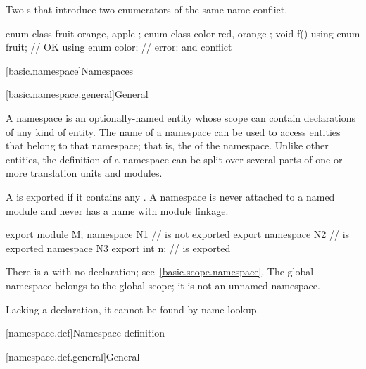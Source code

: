 \pnum
\begin{note}
Two s
that introduce two enumerators of the same name conflict.
\begin{example}
\begin{codeblock}
enum class fruit { orange, apple };
enum class color { red, orange };
void f() {
  using enum fruit;             // OK
  using enum color;             // error:  and  conflict
}
\end{codeblock}
\end{example}
\end{note}

[basic.namespace]{Namespaces}%

[basic.namespace.general]{General}%

\pnum
A namespace is an optionally-named entity
whose scope can contain declarations of any kind of entity.
The name of a
namespace can be used to access entities that belong to that namespace;
that is, the  of the namespace.
Unlike other entities,
the definition of a namespace can be split over several parts of one or
more translation units and modules.

\pnum
\begin{note}
A  is exported
if it contains any
.
A namespace is never attached to a named module
and never has a name with module linkage.
\end{note}
\begin{example}
\begin{codeblock}
export module M;
namespace N1 {}                 //  is not exported
export namespace N2 {}          //  is exported
namespace N3 { export int n; }  //  is exported
\end{codeblock}
\end{example}

\pnum
There is a  with no declaration;
see~\ref{basic.scope.namespace}.
The global namespace belongs to the global scope;
it is not an unnamed namespace.
\begin{note}
Lacking a declaration, it cannot be found by name lookup.
\end{note}

[namespace.def]{Namespace definition}%

[namespace.def.general]{General}%
%

